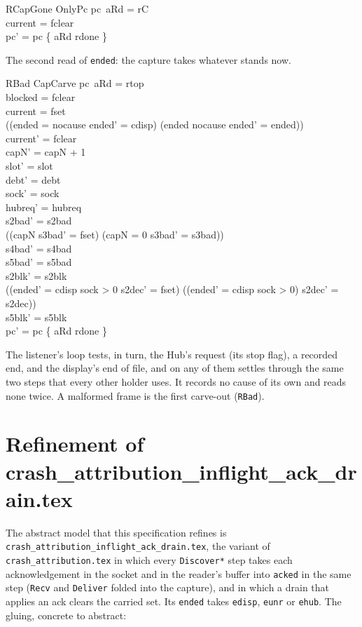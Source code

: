 \documentclass[a4paper,10pt,fleqn]{article}
\begin{document}
\begin{schema}{RCapGone}
  OnlyPc
\where
  pc~aRd = rC \\
  current = fclear \\
  pc' = pc \oplus \{ aRd \mapsto rdone \}
\end{schema}

The second read of \texttt{ended}: the capture takes whatever stands now.

\begin{schema}{RBad}
  CapCarve
\where
  pc~aRd = rtop \\
  blocked = fclear \\
  current = fset \\
  ((ended = nocause \land ended' = cdisp) \lor (ended \neq nocause \land ended' = ended)) \\
  current' = fclear \\
  capN' = capN + 1 \\
  slot' = slot \\
  debt' = debt \\
  sock' = sock \\
  hubreq' = hubreq \\
  s2bad' = s2bad \\
  ((capN  \land s3bad' = fset) \lor (capN = 0 \land s3bad' = s3bad)) \\
  s4bad' = s4bad \\
  s5bad' = s5bad \\
  s2blk' = s2blk \\
  ((ended' = cdisp \land sock > 0 \land s2dec' = fset) \lor
    (\lnot (ended' = cdisp \land sock > 0) \land s2dec' = s2dec)) \\
  s5blk' = s5blk \\
  pc' = pc \oplus \{ aRd \mapsto rdone \}
\end{schema}

The listener's loop tests, in turn, the Hub's request (its stop flag), a
recorded end, and the display's end of file, and on any of them settles through
the same two steps that every other holder uses.  It records no cause of its
own and reads none twice.  A malformed frame is the first carve-out
(\texttt{RBad}).

\section{Refinement of crash\_attribution\_inflight\_ack\_drain.tex}

The abstract model that this specification refines is
\texttt{crash\_attribution\_inflight\_ack\_drain.tex}, the variant of
\texttt{crash\_attribution.tex} in which every \texttt{Discover*} step takes each
acknowledgement in the socket and in the reader's buffer into \texttt{acked} in
the same step (\texttt{Recv} and \texttt{Deliver} folded into the capture), and
in which a drain that applies an ack clears the carried set.  Its \texttt{ended}
takes \texttt{edisp}, \texttt{eunr} or \texttt{ehub}.  The gluing, concrete to
abstract:
\end{document}
